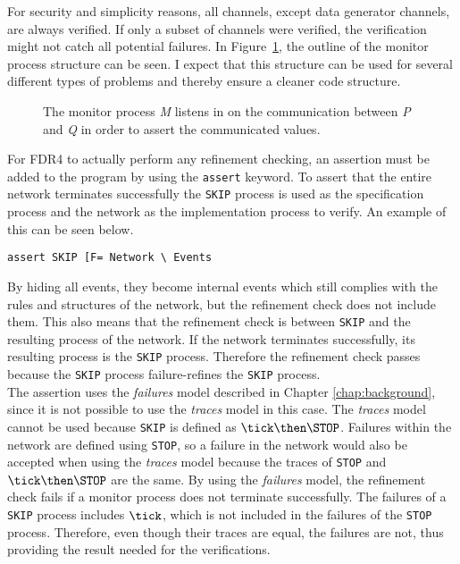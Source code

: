 For security and simplicity reasons, all channels, except data generator channels, are always verified. If only a subset of channels were verified, the verification might not catch all potential failures.
In Figure~\ref{fig:assertion_process}, the outline of the monitor process structure can be seen. I expect that this structure can be used for several different types of problems and thereby ensure a cleaner code structure.
\begin{figure}[!ht]
  \centering
  \caption{The monitor process \textit{M} listens in on the communication between \textit{P} and \textit{Q} in order to assert the communicated values.}
  \label{fig:assertion_process}
\end{figure}

For FDR4 to actually perform any refinement checking, an assertion must be added to the \cspm{} program by using the \texttt{assert} keyword.
To assert that the entire network terminates successfully the \texttt{SKIP} process is used as the specification process and the network as the implementation process to verify. An example of this can be seen below.
\begin{verbatim}
assert SKIP [F= Network \ Events
\end{verbatim}
By hiding all events, they become internal events which still complies with the rules and structures of the network, but the refinement check does not include them. This also means that the refinement check is between \texttt{SKIP} and the resulting process of the network. If the network terminates successfully, its resulting process is the \texttt{SKIP} process. Therefore the refinement check passes because the \texttt{SKIP} process failure-refines the \texttt{SKIP} process.\\

The assertion uses the \textit{failures} model described in Chapter \ref{chap:background}, since it is not possible to use the \textit{traces} model in this case. The \textit{traces} model cannot be used because \texttt{SKIP} is defined as $\tick \then \STOP$. Failures within the network are defined using \texttt{STOP}, so a failure in the network would also be accepted when using the \textit{traces} model because the traces of \texttt{STOP} and $\tick \then \STOP$ are the same. By using the \textit{failures} model, the refinement check fails if a monitor process does not terminate successfully. The failures of a \texttt{SKIP} process includes $\tick$, which is not included in the failures of the \texttt{STOP} process. Therefore, even though their traces are equal, the failures are not, thus providing the result needed for the verifications.
